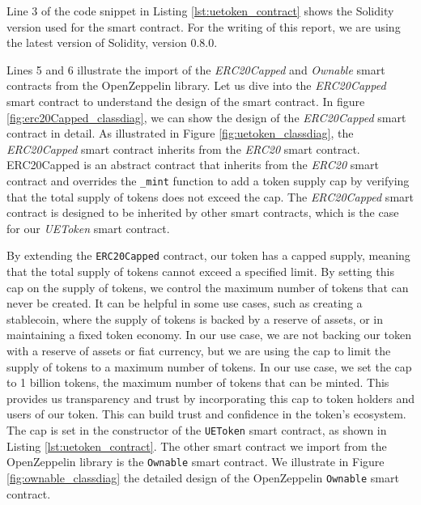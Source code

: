 


Line 3 of the code snippet in Listing \ref{lst:uetoken_contract} shows the Solidity version used for the smart contract. For the writing of this report,
we are using the latest version of Solidity, version 0.8.0.


Lines 5 and 6 illustrate the import of the \textit{ERC20Capped} and \textit{Ownable} smart contracts from the OpenZeppelin library. Let us dive
into the \textit{ERC20Capped} smart contract to understand the design of the smart contract. In figure \ref{fig:erc20Capped_classdiag}, we can show
the design of the \textit{ERC20Capped} smart contract in detail. As illustrated in Figure \ref{fig:uetoken_classdiag}, the \textit{ERC20Capped} smart contract
inherits from the \textit{ERC20} smart contract. ERC20Capped is an abstract contract that inherits from the \textit{ERC20} smart contract and overrides
the \texttt{\_mint} function to add a token supply cap by verifying that the total supply of tokens does not exceed the cap. The \textit{ERC20Capped} smart contract
is designed to be inherited by other smart contracts, which is the case for our \textit{UEToken} smart contract.





By extending the \texttt{ERC20Capped} contract, our token has a capped supply, meaning that the total supply of tokens cannot exceed a specified limit. By setting this cap on the supply of tokens, we control the maximum number of tokens that can never be created. It can be helpful in some use cases, such as creating a stablecoin, where the supply of tokens is backed by a reserve of assets, or in maintaining a fixed token economy. In our use case, we are not backing our token with a reserve of assets or fiat currency, but we are using the cap to limit the supply of tokens to a maximum number of tokens. In our use case, we set the cap to 1 billion tokens, the maximum number of tokens that can be minted. This provides us transparency and trust by incorporating this cap to token holders and users of our token. This can build trust and confidence in the token's ecosystem. The cap is set in the constructor of the \texttt{UEToken} smart contract, as shown in Listing \ref{lst:uetoken_contract}.
The other smart contract we import from the OpenZeppelin library is the \texttt{Ownable} smart contract. We illustrate in Figure \ref{fig:ownable_classdiag} the detailed design of the OpenZeppelin \texttt{Ownable} smart contract.

